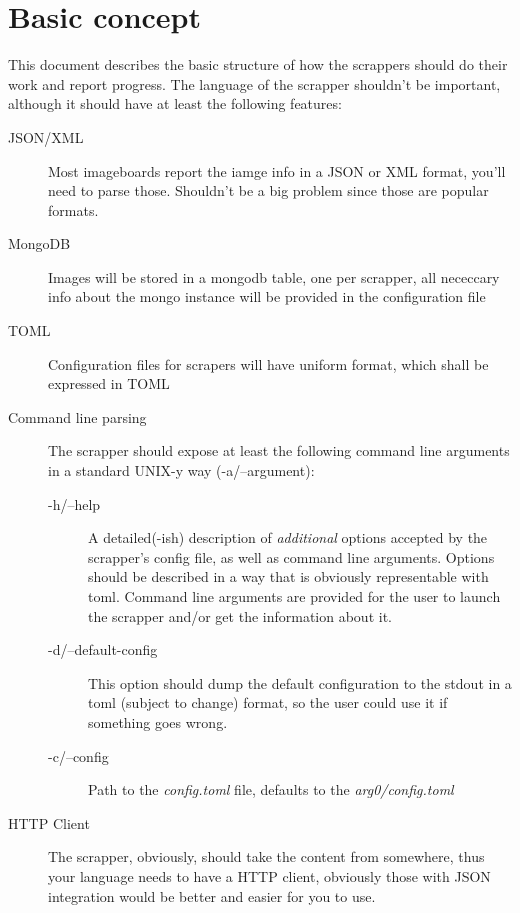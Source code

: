 \documentclass{article}
\begin{document}
\section{Basic concept}

This document describes the basic structure of how the scrappers
should do their work and report progress. The language of the
scrapper shouldn't be important, although it should have at least
the following features:
\begin{description}
\item [JSON/XML]
  Most imageboards report the iamge info in a JSON or XML format,
  you'll need to parse those. Shouldn't be a big problem since those are popular formats.

\item [MongoDB]
  Images will be stored in a mongodb table,
  one per scrapper, all nececcary info about the mongo instance will be provided
  in the configuration file

\item [TOML]
  Configuration files for scrapers will have uniform format, which
  shall be expressed in TOML

\item [Command line parsing]
  The scrapper should expose at least the following command line
  arguments in a standard UNIX-y way (-a/--argument):

  \begin{description}
  \item [-h/--help]
    A detailed(-ish) description of \textit{additional} options accepted by the scrapper's
    config file, as well as command line arguments. Options should be described in a way
    that is obviously representable with toml. Command line arguments are provided
    for the user to launch the scrapper and/or get the information
    about it.

  \item [-d/--default-config]
    This option should dump the default configuration to the stdout in a
    toml (subject to change) format, so the user could use it if something goes wrong.

  \item [-c/--config]
    Path to the \textit{config.toml} file, defaults to the \textit{arg0/config.toml}

  \end{description}

\item [HTTP Client] The scrapper, obviously, should take the content
  from somewhere, thus your language needs to have a HTTP client,
  obviously those with JSON integration would be better and easier for
  you to use.
\end{description}
\end{document}
